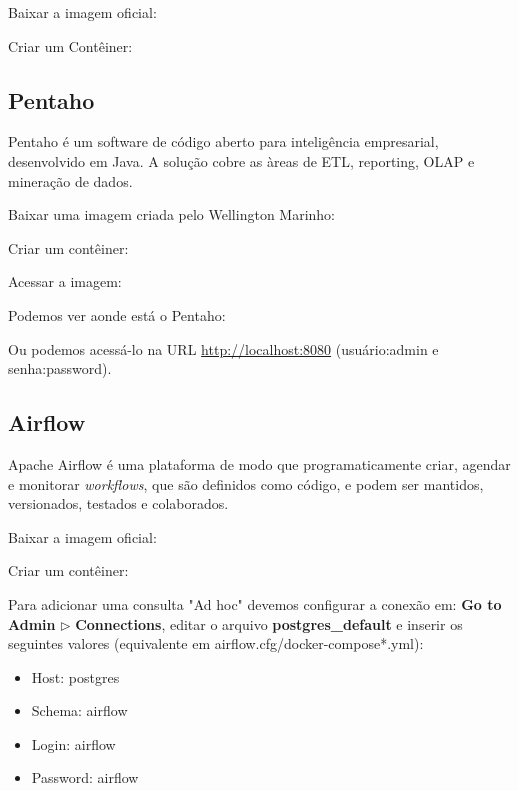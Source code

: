 \documentclass[a4paper,11pt]{article}
\begin{document}
Baixar a imagem oficial: \\

Criar um Contêiner: \\

\subsection{Pentaho}
Pentaho é um software de código aberto para inteligência empresarial, desenvolvido em Java. A solução cobre as àreas de ETL, reporting, OLAP e mineração de dados. 

Baixar uma imagem criada pelo Wellington Marinho: \\

Criar um contêiner: \\

Acessar a imagem: \\

Podemos ver aonde está o Pentaho: \\

Ou podemos acessá-lo na URL \url{http://localhost:8080} (usuário:admin e senha:password).

\subsection{Airflow}
Apache Airflow é uma plataforma de modo que programaticamente criar, agendar e monitorar \textit{workflows}, que são definidos como código, e podem ser mantidos, versionados, testados e colaborados.

Baixar a imagem oficial: \\

Criar um contêiner: \\

Para adicionar uma consulta "Ad hoc" devemos configurar a conexão em: \textbf{Go to Admin} $\triangleright$ \textbf{Connections}, editar o arquivo \textbf{postgres\_default} e inserir os seguintes valores (equivalente em airflow.cfg/docker-compose*.yml): \vspace{-1em}
\begin{itemize}[noitemsep]
	\item Host: postgres
	\item Schema: airflow
	\item Login: airflow
	\item Password: airflow
\end{itemize}
\end{document}
